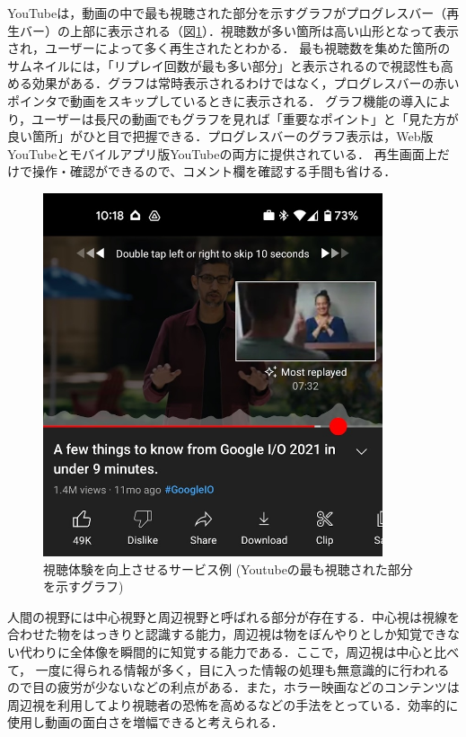 YouTubeは，動画の中で最も視聴された部分を示すグラフがプログレスバー（再生バー）の上部に表示される（図\ref{youtube}）．視聴数が多い箇所は高い山形となって表示され，ユーザーによって多く再生されたとわかる．
最も視聴数を集めた箇所のサムネイルには，「リプレイ回数が最も多い部分」と表示されるので視認性も高める効果がある．グラフは常時表示されるわけではなく，プログレスバーの赤いポインタで動画をスキップしているときに表示される．
グラフ機能の導入により，ユーザーは長尺の動画でもグラフを見れば「重要なポイント」と「見た方が良い箇所」がひと目で把握できる．プログレスバーのグラフ表示は，Web版YouTubeとモバイルアプリ版YouTubeの両方に提供されている．
再生画面上だけで操作・確認ができるので、コメント欄を確認する手間も省ける．

\begin{figure}[H]
    \centering
    \includegraphics[width=10cm]{images/chapter1/YouTube.jpeg}
    \caption{視聴体験を向上させるサービス例 (Youtubeの最も視聴された部分を示すグラフ)}
    \label{youtube}
\end{figure}

人間の視野には中心視野と周辺視野と呼ばれる部分が存在する．中心視は視線を合わせた物をはっきりと認識する能力，周辺視は物をぼんやりとしか知覚できない代わりに全体像を瞬間的に知覚する能力である．ここで，周辺視は中心と比べて，
一度に得られる情報が多く，目に入った情報の処理も無意識的に行われるので目の疲労が少ないなどの利点がある．また，ホラー映画などのコンテンツは周辺視を利用してより視聴者の恐怖を高めるなどの手法をとっている．効率的に使用し動画の面白さを増幅できると考えられる．

